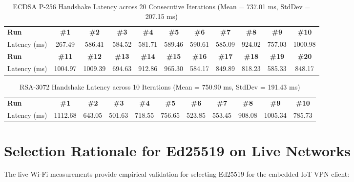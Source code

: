 \documentclass[11pt,a4paper]{article}
\begin{document}
\begin{table}[htbp]
\centering
\footnotesize
\caption{ECDSA P-256 Handshake Latency across 20 Consecutive Iterations (Mean = 737.01 ms, StdDev = 207.15 ms)}
\label{tab:ecdsa_runs}
\begin{tabular}{lcccccccccc}
\toprule
\textbf{Run} & \textbf{\#1} & \textbf{\#2} & \textbf{\#3} & \textbf{\#4} & \textbf{\#5} & \textbf{\#6} & \textbf{\#7} & \textbf{\#8} & \textbf{\#9} & \textbf{\#10} \\
Latency (ms) & 267.49 & 586.41 & 584.52 & 581.71 & 589.46 & 590.61 & 585.09 & 924.02 & 757.03 & 1000.98 \\
\midrule
\textbf{Run} & \textbf{\#11} & \textbf{\#12} & \textbf{\#13} & \textbf{\#14} & \textbf{\#15} & \textbf{\#16} & \textbf{\#17} & \textbf{\#18} & \textbf{\#19} & \textbf{\#20} \\
Latency (ms) & 1004.97 & 1009.39 & 694.63 & 912.86 & 965.30 & 584.17 & 849.89 & 818.23 & 585.33 & 848.17 \\
\bottomrule
\end{tabular}
\end{table}

\begin{table}[htbp]
\centering
\footnotesize
\caption{RSA-3072 Handshake Latency across 10 Iterations (Mean = 750.90 ms, StdDev = 191.43 ms)}
\label{tab:rsa_runs}
\begin{tabular}{lcccccccccc}
\toprule
\textbf{Run} & \textbf{\#1} & \textbf{\#2} & \textbf{\#3} & \textbf{\#4} & \textbf{\#5} & \textbf{\#6} & \textbf{\#7} & \textbf{\#8} & \textbf{\#9} & \textbf{\#10} \\
Latency (ms) & 1112.68 & 643.05 & 501.63 & 718.55 & 756.65 & 523.85 & 553.45 & 908.08 & 1005.34 & 785.73 \\
\bottomrule
\end{tabular}
\end{table}

\section{Selection Rationale for Ed25519 on Live Networks}

The live Wi-Fi measurements provide empirical validation for selecting Ed25519 for the embedded IoT VPN client:
\end{document}

